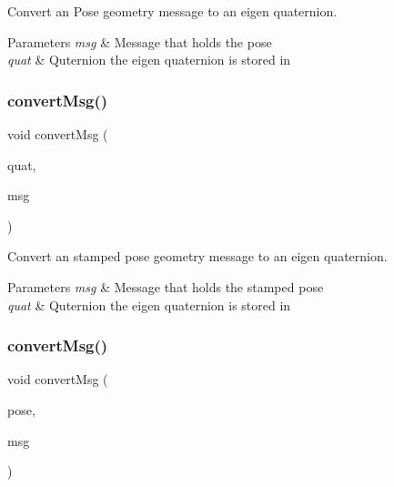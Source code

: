 Convert an Pose geometry message to an eigen quaternion. 


\begin{DoxyParams}{Parameters}
{\em msg} & Message that holds the pose \\
\hline
{\em quat} & Quternion the eigen quaternion is stored in \\
\hline
\end{DoxyParams}
\mbox{\label{group__multi__robot__controller_ga8257db2bb94ec53eadfe87d04b38cc0b}} 
\subsubsection{\texorpdfstring{convert\+Msg()}{convertMsg()}\hspace{0.1cm}{\footnotesize\ttfamily [5/14]}}
{\footnotesize\ttfamily void convert\+Msg (\begin{DoxyParamCaption}\item[{Eigen\+::\+Quaterniond \&}]{quat,  }\item[{geometry\+\_\+msgs\+::\+Pose\+Stamped \&}]{msg }\end{DoxyParamCaption})\hspace{0.3cm}{\ttfamily [inline]}}



Convert an stamped pose geometry message to an eigen quaternion. 


\begin{DoxyParams}{Parameters}
{\em msg} & Message that holds the stamped pose \\
\hline
{\em quat} & Quternion the eigen quaternion is stored in \\
\hline
\end{DoxyParams}
\mbox{\label{group__multi__robot__controller_gafde5764b46f0189c2aea14ed57434708}} 
\subsubsection{\texorpdfstring{convert\+Msg()}{convertMsg()}\hspace{0.1cm}{\footnotesize\ttfamily [6/14]}}
{\footnotesize\ttfamily void convert\+Msg (\begin{DoxyParamCaption}\item[{Eigen\+::\+Matrix$<$ double, 7, 1 $>$ \&}]{pose,  }\item[{geometry\+\_\+msgs\+::\+Pose \&}]{msg }\end{DoxyParamCaption})\hspace{0.3cm}{\ttfamily [inline]}}



